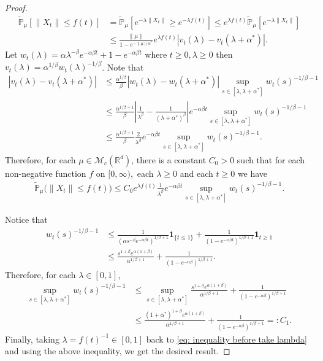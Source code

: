 \documentclass[12pt]{amsart}
\theoremstyle{plain}
\theoremstyle{definition}
\numberwithin{equation}{section}
\begin{document}
\begin{proof}
\begin{align*}
    \mathbb{\tilde{P}}_{\mu}[\|X_t\|\leq f(t)]&=\mathbb{\tilde{P}}_{\mu}[e^{-\lambda\|X_t\|}\geq e^{-\lambda f(t)}]\leq e^{\lambda f(t)}\mathbb{\tilde{P}}_{\mu}[e^{-\lambda \|X_t\|}]\\
    &\leq \frac{\|\mu\|}{1-e^{-\|\mu\|\alpha^*}}e^{\lambda f(t)}\left|v_t(\lambda)-v_t(\lambda+\alpha^*)\right|.
\end{align*}
	Let $w_t(\lambda)=\alpha \lambda^{-\beta}e^{-\alpha \beta t}+1-e^{-\alpha\beta t}$ where $t\geq 0,\lambda\geq0$ then $v_t(\lambda)=\alpha^{1/\beta}w_t(\lambda)^{-1/\beta}$.
Note that
\begin{align*}
    \left|v_t(\lambda)-v_t(\lambda+\alpha^*)\right|&\leq\frac {\alpha^{1/\beta}}{\beta} \left|w_t(\lambda)-w_t(\lambda+\alpha^*)\right| \sup_{s\in [\lambda,\lambda+\alpha^*]}w_t(s)^{-1/\beta-1}\\
    &\leq  \frac{\alpha^{1/\beta+1}}{\beta}\left|\frac{1}{\lambda^{\beta}}-\frac{1}{(\lambda+\alpha^*)^{\beta}}\right|e^{-\alpha\beta t} \sup_{s\in [\lambda,\lambda+\alpha^*]}w_t(s)^{-1/\beta-1}\\
    &\leq  \frac{\alpha^{1/\beta+1}}{\beta}\frac{2}{\lambda^{\beta}}e^{-\alpha\beta t} \sup_{s\in [\lambda,\lambda+\alpha^*]}w_t(s)^{-1/\beta-1}.
\end{align*}
Therefore, for each $\mu\in \mathcal M_c(\mathbb R^d)$, there is a constant $C_0>0$ such that for each non-negative function $f$ on $[0,\infty),$ each $\lambda \geq 0$ and each $t\geq 0$ we have
\begin{align}
\label{eq: inequality before take lambda}
    \mathbb{\tilde{P}}_{\mu}\big(\|X_t\|\leq f(t)\big)
    \leq C_0e^{\lambda f(t)}\frac{1}{\lambda^{\beta}}e^{-\alpha\beta t} \sup_{s\in [\lambda,\lambda+\alpha^*]}w_t(s)^{-1/\beta-1}.
\end{align}

Notice that
\begin{align*}
    w_t(s)^{-1/\beta-1}&\leq \frac{1}{(\alpha s^{-\beta}e^{-\alpha \beta t})^{1/
    \beta+1}}\mathbf{1}_{\{t\leq 1\}}+\frac{1}{(1-e^{-\alpha\beta t})^{1/\beta+1}}\mathbf{1}_{t\geq 1}\\
    &\leq \frac{s^{1+\beta}e^{\alpha(1+\beta)}}{\alpha^{1/\beta +1}}+\frac{1}{(1-e^{-\alpha\beta })^{1/\beta+1}}.
\end{align*}
Therefore, for each $\lambda \in [0,1]$,
\begin{align*}
    \sup_{s\in [\lambda,\lambda+\alpha^*]}w_t(s)^{-1/\beta-1}
    &\leq\sup_{s\in [\lambda,\lambda+\alpha^*]}\frac{s^{1+\beta}e^{\alpha(1+\beta)}}{\alpha^{1/\beta +1}}+\frac{1}{(1-e^{-\alpha\beta })^{1/\beta+1}}\\
    &\leq \frac{(1+\alpha^*)^{1+\beta}e^{\alpha(1+\beta)}}{\alpha^{1/\beta+1}}+\frac{1}{(1-e^{-\alpha\beta })^{1/\beta+1}} =: C_1.
\end{align*}
Finally, taking $\lambda = f(t)^{-1} \in [0,1]$ back to \eqref{eq: inequality before take lambda} and using the above inequality, we get the desired result.
\end{proof}
\end{document}
